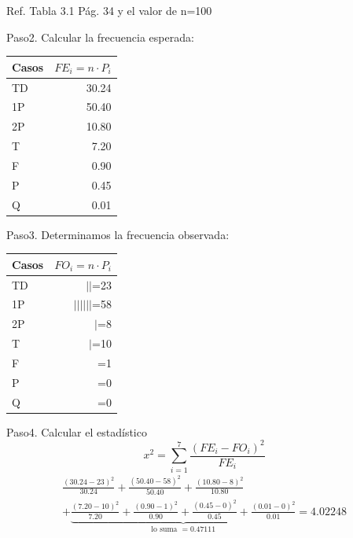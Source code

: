 \documentclass[11pt,letterpaper]{report}
\begin{document}
\qquad Ref. Tabla 3.1 Pág. 34 y el valor de n=100

Paso2. Calcular la frecuencia esperada:

\begin{table}[H]
\centering
\begin{tabular}{|l|r|}
\hline
Casos & $FE_i = n \cdot P_i$\\
\hline
TD & 30.24\\
1P & 50.40\\
2P & 10.80\\
T & 7.20\\
F & 0.90\\
P & 0.45\\
Q & 0.01\\
\hline
\end{tabular}
\end{table}

\begin{center}
\end{center}

Paso3. Determinamos la frecuencia observada:

\begin{table}[H]
\centering
\begin{tabular}{|l|r|}
\hline
Casos & $FO_i = n \cdot P_i$\\
\hline
TD & $||$=23\\
1P & $||||||$=58\\
2P & $|$=8\\
T & $|$=10\\
F & =1\\
P & =0\\
Q & =0\\
\hline
\end{tabular}
\end{table}

\begin{center}
\end{center}

\begin{center}
\end{center}

Paso4. Calcular el estadístico
\[
x^2 = \sum_{i=1}^{7}\frac{(FE_i - FO_i)^2}{FE_i}
\]
\begin{multline*}
\frac{(30.24-23)^2}{30.24} + \frac{(50.40-58)^2}{50.40} + \frac{(10.80-8)^2}{10.80}\\
+ \underbrace{\frac{(7.20-10)^2}{7.20} + \frac{(0.90-1)^2}{0.90} + \frac{(0.45-0)^2}{0.45} + \frac{(0.01-0)^2}{0.01}}_{\text{lo suma } = 0.47111} = 4.02248
\end{multline*}
\end{document}
